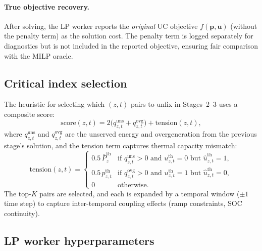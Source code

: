 \documentclass{article}
\begin{document}
\paragraph{True objective recovery.}
After solving, the LP worker reports the \emph{original} UC objective $f(\mathbf{p}, \mathbf{u})$ (without the penalty term) as the solution cost. The penalty term is logged separately for diagnostics but is not included in the reported objective, ensuring fair comparison with the MILP oracle.


\subsection{Critical index selection}

The heuristic for selecting which $(z, t)$ pairs to unfix in Stages~2--3 uses a composite score:
\begin{equation}
\mathrm{score}(z, t) = 2\bigl(q^{\mathrm{uns}}_{z,t} + q^{\mathrm{ovg}}_{z,t}\bigr) + \mathrm{tension}(z, t),
\label{eq:critical_score}
\end{equation}
where $q^{\mathrm{uns}}_{z,t}$ and $q^{\mathrm{ovg}}_{z,t}$ are the unserved energy and overgeneration from the previous stage's solution, and the tension term captures thermal capacity mismatch:
\begin{equation}
\mathrm{tension}(z, t) = \begin{cases}
0.5\,\overline{P}^{\mathrm{th}}_z & \text{if } q^{\mathrm{uns}}_{z,t} > 0 \text{ and } u^{\mathrm{th}}_{z,t} = 0 \text{ but } \hat{u}^{\mathrm{th}}_{z,t} = 1, \\
0.5\,p^{\mathrm{th}}_{z,t} & \text{if } q^{\mathrm{ovg}}_{z,t} > 0 \text{ and } u^{\mathrm{th}}_{z,t} = 1 \text{ but } \hat{u}^{\mathrm{th}}_{z,t} = 0, \\
0 & \text{otherwise}.
\end{cases}
\label{eq:tension}
\end{equation}
The top-$K$ pairs are selected, and each is expanded by a temporal window ($\pm 1$ time step) to capture inter-temporal coupling effects (ramp constraints, SOC continuity).


\subsection{LP worker hyperparameters}
\end{document}
